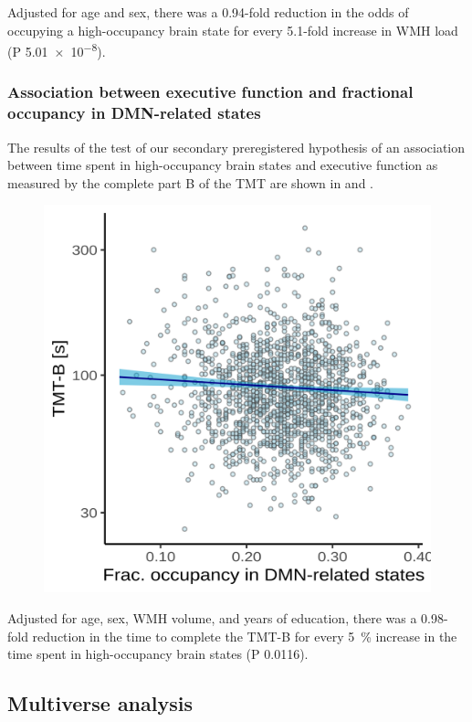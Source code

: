 

Adjusted for age and sex, there was a \num{0.94}-fold reduction in the odds of occupying a high-occupancy brain state for every \num{5.1}-fold increase in WMH load (P \num{5.01e-8}).

\subsubsection{Association between executive function and fractional occupancy in DMN-related states}

The results of the test of our secondary preregistered hypothesis of an association between time spent in high-occupancy brain states and executive function as measured by the complete part B of the TMT are shown in  and .

\begin{figure}
    \includegraphics[width=.5\linewidth]{./../analysis/derivatives/Figures/Fig_hyp2.png}
    \label{fig:hyp2}
\end{figure}



Adjusted for age, sex, WMH volume, and years of education, there was a \num{0.98}-fold reduction in the time to complete the TMT-B for every \qty{5}{\percent} increase in the time spent in high-occupancy brain states (P \num{0.0116}).


\subsection{Multiverse analysis}

